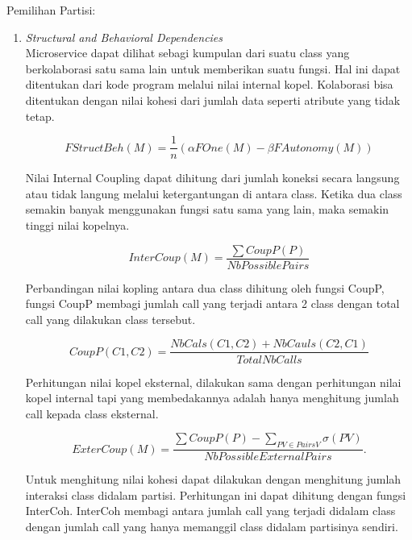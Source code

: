 Pemilihan Partisi:	
\begin{enumerate}[leftmargin=1.3cm]
	\item \textit{Structural and Behavioral Dependencies} \cite{5B1}\\
	Microservice dapat dilihat sebagi kumpulan dari suatu class yang berkolaborasi satu sama lain untuk memberikan suatu fungsi. Hal ini dapat ditentukan dari kode program melalui nilai internal kopel. Kolaborasi bisa ditentukan dengan nilai kohesi dari jumlah data seperti atribute yang tidak tetap.

	\begin{equation}
	F S t r u c t B e h(M)={\frac{1}{n}}(\alpha F O n e(M)-\beta F A u t o n o m y(M))
	\end{equation}
	
	Nilai Internal Coupling dapat dihitung dari jumlah koneksi secara langsung atau tidak langung melalui ketergantungan di antara class. Ketika dua class semakin banyak menggunakan fungsi satu sama yang lain, maka semakin tinggi nilai kopelnya. 

	\begin{equation}
		I n t e r C o u p(M)=\frac{\sum C o u p P(P)}{N b P o s s i b l e P a i r s}
	\end{equation}
	
	Perbandingan nilai kopling antara dua class dihitung oleh fungsi CoupP, fungsi CoupP membagi jumlah call yang terjadi antara 2 class dengan total call yang dilakukan class tersebut.

	\begin{equation}
		C o u p P(C1,C2)={\frac{N b C a l s(C1,C2)+N b C a u l s(C2,C1)}{T o t a l N b C a l l s}}
	\end{equation}	
	
	Perhitungan nilai kopel eksternal, dilakukan sama dengan perhitungan nilai kopel internal tapi yang membedakannya adalah hanya menghitung jumlah call kepada class eksternal.

	\begin{equation}
		E x t e r C o u p(M)=\frac{\sum C o u p P(P)-\sum_{P V\in P a i r s V}\sigma(P V)}{N b P o s s i b l e E x t e r n a l P a i r s}.
	\end{equation}
	
	Untuk menghitung nilai kohesi dapat dilakukan dengan menghitung jumlah interaksi class didalam partisi. Perhitungan ini dapat dihitung dengan fungsi InterCoh. InterCoh membagi antara jumlah call yang terjadi didalam class dengan jumlah call yang hanya memanggil class didalam partisinya sendiri.
	

\end{enumerate}

